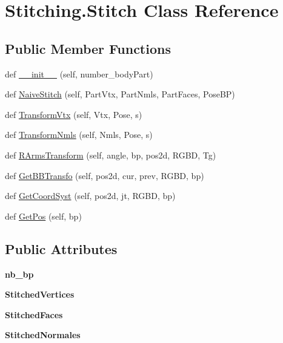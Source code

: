 \hypertarget{class_stitching_1_1_stitch}{}\section{Stitching.\+Stitch Class Reference}
\label{class_stitching_1_1_stitch}
\subsection*{Public Member Functions}
\begin{DoxyCompactItemize}
\item 
def \hyperlink{class_stitching_1_1_stitch_ab891a54caf4e40cd3a6eacdfae3d08f2}{\+\_\+\+\_\+init\+\_\+\+\_\+} (self, number\+\_\+body\+Part)
\item 
def \hyperlink{class_stitching_1_1_stitch_ac88004e122bb16c19ef3038d856be04a}{Naive\+Stitch} (self, Part\+Vtx, Part\+Nmls, Part\+Faces, Pose\+BP)
\item 
def \hyperlink{class_stitching_1_1_stitch_addf2733c95c1a99895485f639989c971}{Transform\+Vtx} (self, Vtx, Pose, s)
\item 
def \hyperlink{class_stitching_1_1_stitch_a9df52cb70ec0a02cf93ac0ea9f09706c}{Transform\+Nmls} (self, Nmls, Pose, s)
\item 
def \hyperlink{class_stitching_1_1_stitch_a14624518ed5cbc4422762ff59d3c5bb8}{R\+Arms\+Transform} (self, angle, bp, pos2d, R\+G\+BD, Tg)
\item 
def \hyperlink{class_stitching_1_1_stitch_a24d4c32a258141cbdc3cfa3bae127fe7}{Get\+B\+B\+Transfo} (self, pos2d, cur, prev, R\+G\+BD, bp)
\item 
def \hyperlink{class_stitching_1_1_stitch_ae2a91306c029bcd2b6631a64d662cbff}{Get\+Coord\+Syst} (self, pos2d, jt, R\+G\+BD, bp)
\item 
def \hyperlink{class_stitching_1_1_stitch_a0ba4c013f984b9b0fa636a2d120094d2}{Get\+Pos} (self, bp)
\end{DoxyCompactItemize}
\subsection*{Public Attributes}
\begin{DoxyCompactItemize}
\item 
\mbox{\label{class_stitching_1_1_stitch_a6984b78515332ecfd8c9bfd783f91e49}} 
{\bfseries nb\+\_\+bp}
\item 
\mbox{\label{class_stitching_1_1_stitch_a4de61586c9c27338b95e1a0ccefc3c34}} 
{\bfseries Stitched\+Vertices}
\item 
\mbox{\label{class_stitching_1_1_stitch_ad76a66008928b460d7c1b7e82972cbeb}} 
{\bfseries Stitched\+Faces}
\item 
\mbox{\label{class_stitching_1_1_stitch_a4744a49d727d4966433272eb4f721560}} 
{\bfseries Stitched\+Normales}
\end{DoxyCompactItemize}


